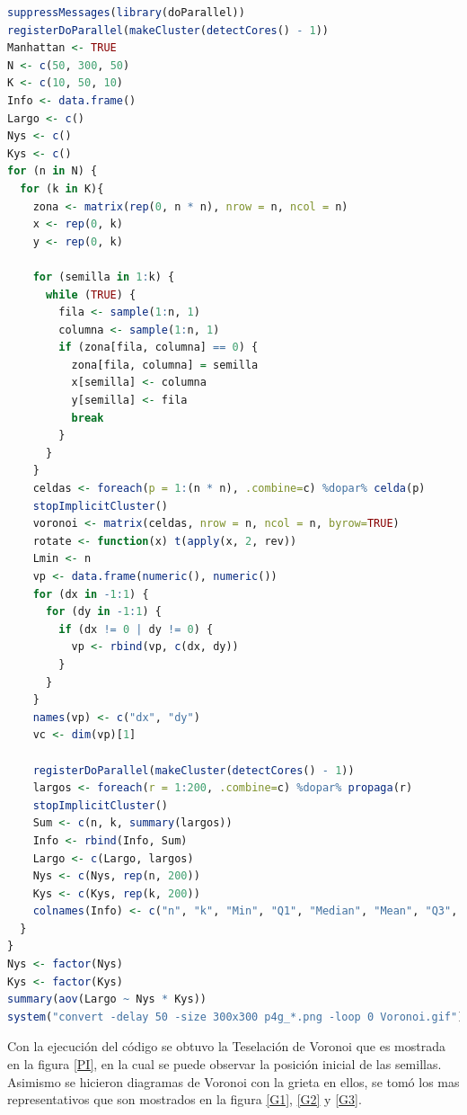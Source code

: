 \documentclass[12pt, letterpaper] {article}
\begin{document}
\begin{lstlisting}[language=R]
suppressMessages(library(doParallel))
registerDoParallel(makeCluster(detectCores() - 1))
Manhattan <- TRUE
N <- c(50, 300, 50)
K <- c(10, 50, 10)
Info <- data.frame()
Largo <- c()
Nys <- c()
Kys <- c()
for (n in N) {
  for (k in K){
    zona <- matrix(rep(0, n * n), nrow = n, ncol = n)
    x <- rep(0, k) 
    y <- rep(0, k) 
    
    for (semilla in 1:k) {
      while (TRUE) { 
        fila <- sample(1:n, 1)
        columna <- sample(1:n, 1)
        if (zona[fila, columna] == 0) {
          zona[fila, columna] = semilla
          x[semilla] <- columna
          y[semilla] <- fila
          break
        }
      }
    }
    celdas <- foreach(p = 1:(n * n), .combine=c) %dopar% celda(p)
    stopImplicitCluster()
    voronoi <- matrix(celdas, nrow = n, ncol = n, byrow=TRUE)
    rotate <- function(x) t(apply(x, 2, rev))    
    Lmin <- n 
    vp <- data.frame(numeric(), numeric()) 
    for (dx in -1:1) {
      for (dy in -1:1) {
        if (dx != 0 | dy != 0) { 
          vp <- rbind(vp, c(dx, dy))
        }
      }
    }
    names(vp) <- c("dx", "dy")
    vc <- dim(vp)[1]
    
    registerDoParallel(makeCluster(detectCores() - 1))
    largos <- foreach(r = 1:200, .combine=c) %dopar% propaga(r)
    stopImplicitCluster()
    Sum <- c(n, k, summary(largos))
    Info <- rbind(Info, Sum)
    Largo <- c(Largo, largos)
    Nys <- c(Nys, rep(n, 200))
    Kys <- c(Kys, rep(k, 200))
    colnames(Info) <- c("n", "k", "Min", "Q1", "Median", "Mean", "Q3", "Max")
  }
}
Nys <- factor(Nys)
Kys <- factor(Kys)
summary(aov(Largo ~ Nys * Kys))
system("convert -delay 50 -size 300x300 p4g_*.png -loop 0 Voronoi.gif") 
\end{lstlisting}\vspace{-2mm}

Con la ejecución del código se obtuvo la Teselación de Voronoi que es mostrada en la figura \ref{PI}, en la cual se puede observar la posición inicial de las semillas. Asimismo se hicieron diagramas de Voronoi con la grieta en ellos, se tomó los mas representativos que son mostrados en la figura \ref{G1}, \ref{G2} y \ref{G3}.
\end{document}
